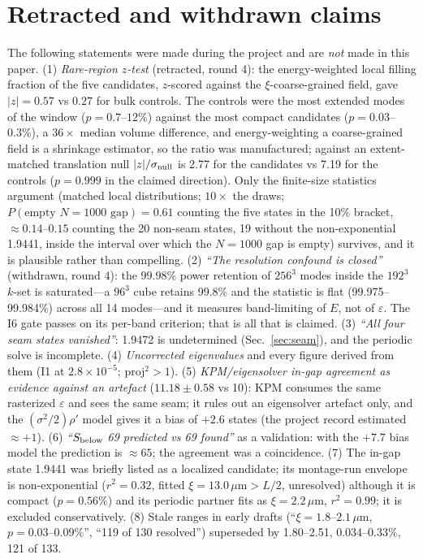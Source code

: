 \documentclass[aps,prl,preprint,superscriptaddress,longbibliography,nofootinbib]{revtex4-2}
\newcommand{\um}{\,\mu\mathrm{m}}
\begin{document}
\section{Retracted and withdrawn claims}\label{sec:retracted}
The following statements were made during the project and are \emph{not} made in this paper. (1) \emph{Rare-region $z$-test} (retracted, round 4): the energy-weighted local filling fraction of the five candidates, $z$-scored against the $\xi$-coarse-grained field, gave $|z|=0.57$ vs $0.27$ for bulk controls. The controls were the most extended modes of the window ($p=0.7$--$12\%$) against the most compact candidates ($p=0.03$--$0.3\%$), a $36\times$ median volume difference, and energy-weighting a coarse-grained field is a shrinkage estimator, so the ratio was manufactured; against an extent-matched translation null $|z|/\sigma_{\rm null}$ is 2.77 for the candidates vs 7.19 for the controls ($p=0.999$ in the claimed direction). Only the finite-size statistics argument (matched local distributions; $10\times$ the draws; $P(\text{empty }N=1000\text{ gap})=0.61$ counting the five states in the 10\% bracket, $\approx0.14$--$0.15$ counting the 20 non-seam states, 19 without the non-exponential 1.9441, inside the interval over which the $N=1000$ gap is empty) survives, and it is plausible rather than compelling. (2) \emph{``The resolution confound is closed''} (withdrawn, round 4): the 99.98\% power retention of $256^3$ modes inside the $192^3$ $k$-set is saturated---a $96^3$ cube retains 99.8\% and the statistic is flat (99.975--99.984\%) across all 14 modes---and it measures band-limiting of $E$, not of $\varepsilon$. The I6 gate passes on its per-band criterion; that is all that is claimed. (3) \emph{``All four seam states vanished''}: 1.9472 is undetermined (Sec.~\ref{sec:seam}), and the periodic solve is incomplete. (4) \emph{Uncorrected eigenvalues} and every figure derived from them (I1 at $2.8\times10^{-5}$; proj$^2>1$). (5) \emph{KPM/eigensolver in-gap agreement as evidence against an artefact} ($11.18\pm0.58$ vs 10): KPM consumes the same rasterized $\varepsilon$ and sees the same seam; it rules out an eigensolver artefact only, and the $(\sigma^2/2)\rho'$ model gives it a bias of $+2.6$ states (the project record estimated $\approx+1$). (6) \emph{``$S_{\rm below}$ 69 predicted vs 69 found''} as a validation: with the $+7.7$ bias model the prediction is $\approx65$; the agreement was a coincidence. (7) The in-gap state 1.9441 was briefly listed as a localized candidate; its montage-run envelope is non-exponential ($r^2=0.32$, fitted $\xi=13.0\um>L/2$, unresolved) although it is compact ($p=0.56\%$) and its periodic partner fits as $\xi=2.2\um$, $r^2=0.99$; it is excluded conservatively. (8) Stale ranges in early drafts (``$\xi=1.8$--$2.1\um$, $p=0.03$--$0.09\%$'', ``119 of 130 resolved'') superseded by 1.80--2.51, 0.034--0.33\%, 121 of 133.
\end{document}
